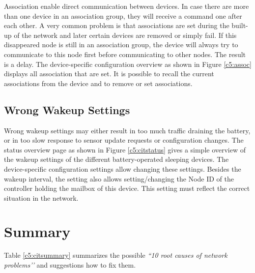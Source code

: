 Association enable direct communication between devices. In case there are more than one 
device in an association group, they will receive a command one after each other.
A very common problem is that associations are set during the built-up of the network and 
later certain devices are removed or simply fail. If this disappeared node is still 
in an association group, the device will always try to communicate to this node first 
before communicating to other nodes. The result is a delay. The device-specific 
configuration overview as shown in Figure \ref{c5:assoc} displays all association that 
are set. It is possible to recall the current associations from the device and to 
remove or set associations.

\subsection{Wrong Wakeup Settings}

Wrong wakeup settings may either result in too much traffic draining the battery, or in 
too slow response to sensor update requests or configuration changes. The status overview 
page as shown in Figure \ref{c5:citstatus} gives a simple overview of the wakeup settings 
of the different battery-operated sleeping devices. The device-specific configuration settings 
allow changing these settings. Besides the wakeup interval, the setting also allows 
setting/changing the Node ID of the controller holding the mailbox of this device. 
This setting must reflect the correct situation in the network.


\section{Summary}

Table \ref{c5:citsummary} summarizes the possible {\em ``10 root causes of \zwave network problems’’} 
and suggestions how to fix them.

